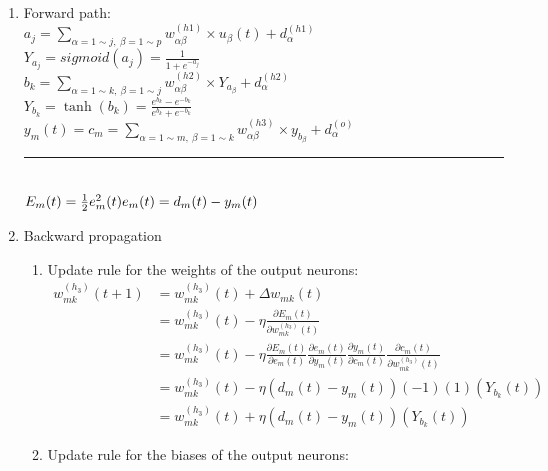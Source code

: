\documentclass[12pt,a4paper]{article}
\begin{document}
\begin{CJK}{UTF8}{bsmi}
\begin{enumerate}
	\vspace{1cm}
	\item Forward path:
\vspace{0.5cm}
\\	
	$a_j=\sum\limits_{\alpha=1 \sim j,\  \beta=1 \sim p}
w_{\alpha\beta}^{(h1)} \times u_\beta(t)+d_\alpha^{(h1)} $
\vspace{0.5cm}
\\
	$Y_{a_j}=sigmoid(a_j)=\frac{1}{1+ e^{-a_j}}$
\vspace{0.5cm}
\\
	$b_k=\sum\limits_{\alpha=1 \sim k,\  \beta=1 \sim j}
w_{\alpha\beta}^{(h2)} \times Y_{a_\beta}+d_\alpha^{(h2)} $
\vspace{0.5cm}
\\
	$Y_{b_k}=\tanh(b_k)=\frac{e^{b_k}-e^{-b_k}}{e^{b_k}+e^{-b_k}}$
\vspace{0.5cm}
\\
	$y_m(t)=c_m=\sum\limits_{\alpha=1 \sim m,\  \beta=1 \sim k}
	w_{\alpha\beta}^{(h3)} \times y_{b_\beta}+d_\alpha^{(o)} $
\\[0.5cm]
\noindent\rule{\textwidth}{1pt}
\\[0.5cm]
$E_m(t)=\frac{1}{2}e_m^2(t)
\\[0.5cm]
e_m(t)=d_m(t)-y_m(t)
$
\newpage
\item Backward propagation
\begin{enumerate}
	\item Update rule for the weights of the output neurons:
\vspace{0.5cm}
\\
$
	\begin{aligned}
	w_{mk}^{(h_3)}(t+1) & =w_{mk}^{(h_3)}(t)+\Delta w_{mk}(t)
\\[0.5cm]
	& =	w_{mk}^{(h_3)}(t)-\eta\frac{\partial E_m(t)}{\partial w_{mk}^{(h_3)}(t)}
\\[0.5cm]
	& = w_{mk}^{(h_3)}(t)-\eta\frac{\partial E_m(t)}{\partial e_{m}(t)}
	\frac{\partial e_{m}(t)}{\partial y_m(t)}
	\frac{\partial y_m(t)}{\partial c_{m}(t)}
	\frac{\partial c_m(t)}{\partial w_{mk}^{(h_3)}(t)}
\\[0.5cm]
	& = w_{mk}^{(h_3)}(t)-\eta(d_m(t)-y_m(t))(-1)(1)(Y_{b_k}(t))
\\[0.5cm]
	& = w_{mk}^{(h_3)}(t)+\eta(d_m(t)-y_m(t))(Y_{b_k}(t))	
	\end{aligned}
$
	\item Update rule for the biases of the output neurons:
\vspace{0.5cm}

\end{enumerate}
\end{enumerate}
\end{CJK}
\end{document}
